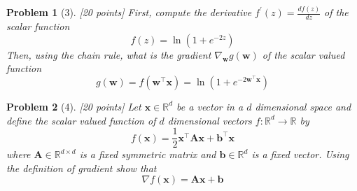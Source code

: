 \documentclass[11pt]{article}
\theoremstyle{quest}
\newtheorem*{problem}{Problem}
\begin{document}
\begin{problem}[3] [20 points]
First, compute the derivative $f^{\prime}(z) = \frac{df(z)}{dz}$ of the scalar function $$f(z) = \ln(1+e^{-2z})$$
Then, using the chain rule, what is the gradient $\nabla_{\bm{w}}g(\bm{w})$ of the scalar valued function $$g(\bm{w})=f(\bm{w}^{\top}\bm{x}) = \ln(1+e^{-2\bm{w}^{\top}\bm{x}})$$
\end{problem}

\begin{problem}[4]
[20 points] Let $\bm{x} \in \mathbb{R}^{d}$ be a vector in a $d$ dimensional space and define the scalar valued function of $d$ dimensional vectors $f: \mathbb{R}^{d} \rightarrow \mathbb{R}$ by
\begin{equation}
  f(\bm{x}) = \frac{1}{2}\bm{x}^{\top}\bm{A}\bm{x} + \bm{b}^{\top}\bm{x}
\end{equation}
where $\bm{A} \in \mathbb{R}^{d \times d}$ is a fixed symmetric matrix and $\bm{b} \in \mathbb{R}^{d}$ is a fixed vector. Using the definition of gradient show that
\begin{equation}
  \nabla f(\bm{x}) = \bm{A}\bm{x} + \bm{b}
\end{equation}
\end{problem}
\end{document}
